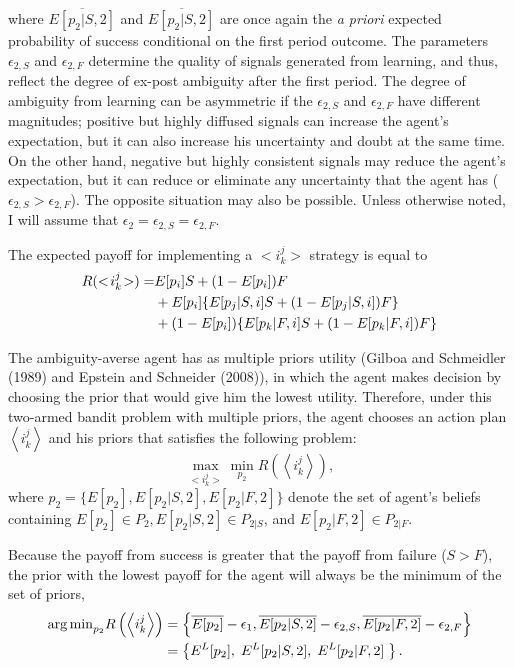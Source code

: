 \documentclass[11pt]{article} %
\theoremstyle{exampstyle}
\newcommand{\be}{\begin{equation}}
\newcommand{\ee}{\end{equation}}
\newcommand{\eq}[1]{\begin{align}#1\end{align}}
\newcommand{\la}{ \left < }
\newcommand{\ra}{ \right > }
\begin{document}
where $\overline{E[p_2 |S,2]}$ and $\overline{E[p_2 |S,2]}$ are once again the \emph{a priori} expected probability of success conditional on the first period outcome. The parameters $\epsilon_{2,S}$ and $\epsilon_{2,F}$ determine the quality of signals generated from learning, and thus, reflect the degree of ex-post ambiguity after the first period. The degree of ambiguity from learning can be asymmetric if the $\epsilon_{2,S}$ and $\epsilon_{2,F}$ have different magnitudes; positive but highly diffused signals can increase the agent's expectation, but it can also increase his uncertainty and doubt at the same time. On the other hand, negative but highly consistent signals may reduce the agent's expectation, but it can reduce or eliminate any uncertainty that the agent has ($\epsilon_{2,S} > \epsilon_{2,F}$). The opposite situation may also be possible. Unless otherwise noted, I will assume that $\epsilon_2 = \epsilon_{2,S} =\epsilon_{2,F}$.

The expected payoff for implementing a $<\!i^j_k\!>$ strategy is equal to
\begin{align}
R(<\!i^j_k\!>) =& E[p_i] S + (1-E[p_i]) F  \\
& + E[p_i] \{E[p_j|S,i] S + (1-E[p_j | S,i]) F \}  \notag \\
& + (1-E[p_i]) \{E[p_k | F,i] S+(1-E[p_k|F,i]) F \} \notag
\end{align}

The ambiguity-averse agent has as multiple priors utility (Gilboa and Schmeidler (1989) and Epstein and Schneider (2008)), in which the agent makes decision by choosing the prior that would give him the lowest utility. Therefore, under this two-armed bandit problem with multiple priors, the agent chooses an action plan $\la i^j_k \ra$ and his priors that satisfies the following problem:
\be
\max_{<i^j_k\!>}{ \min_{p_2} R\left(\la i^j_k \ra\right)},
\ee
where $p_2 = \{E[p_2],E[p_2|S,2],E[p_2|F,2]\}$ denote the set of agent's beliefs containing $ E[p_2] \in P_2, E[p_2|S,2] \in P_{2|S}$, and $E[p_2|F,2] \in P_{2|F}$.

Because the payoff from success is greater that the payoff from failure ($S>F$), the prior with the lowest payoff for the agent will always be the minimum of the set of priors, 
\eq{
{\arg \min}_{p_2} R\left(\la i^j_k \ra\right) &= \left \{\overline{E[p_2]} - \epsilon_1, \overline{E[p_2|S,2]} - \epsilon_{2,S},  \overline{E[p_2|F,2]} - \epsilon_{2,F} \right \} \notag \\
& = \left \{E^L[p_2],\; E^L[p_2|S,2],\; E^L[p_2|F,2] \; \right \} \notag .
}
\end{document}
